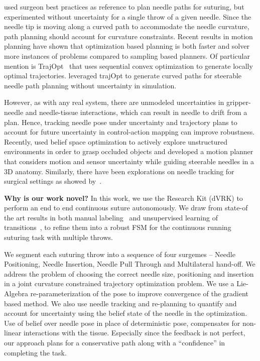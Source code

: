 \documentclass[0-suturing.tex]{subfiles}
\begin{document}
\citet{Jackson2013Needle} used surgeon best practices as reference to plan needle paths for suturing, but experimented without uncertainty for a single throw of a given needle. Since the needle tip is moving along a curved path to accommodate the needle curvature, path planning should account for curvature constraints. Recent results in motion planning have shown that optimization based planning is both faster and solver more instances of problems compared to sampling based planners.
Of particular mention is TrajOpt~\cite{Schulman2014Motion} that uses sequential convex optimization to generate locally optimal trajectories.
\citet{Duan2014Planning} leveraged trajOpt to generate curved paths for steerable needle path planning without uncertainty in simulation.

However, as with any real system, there are unmodeled uncertainties in gripper-needle and needle-tissue interactions, which can result in needle to drift from a plan. Hence, tracking needle pose under uncertainty and trajectory plans to account for future uncertainty in control-action mapping can improve robustness. 
Recently, \cite{Kahn2015Active} used belief space optimization to actively explore unstructured environments in order to grasp occluded objects and \cite{Sun2014Motion} developed a motion planner that considers motion and sensor uncertainty while guiding steerable needles in a 3D anatomy.
Similarly, there have been explorations on needle tracking for surgical settings as showed by~\cite{wengert2007endoscopic, speidel2015image}.

\vspace{3pt}
\noindent \textbf{Why is our work novel? }
In this work, we use the \davinci Research Kit (dVRK) to perform an end to end continuous suture autonomously. We draw from state-of the art results in both manual labeling~\cite{gao2014jhu} and unsupervised learning of transitions~\cite{krishnan2015tsc}, to refine them into a robust FSM for the continuous running suturing task with multiple throws.

We segment each suturing throw into a sequence of four surgemes -- Needle Positioning, Needle Insertion, Needle Pull Through and Multilateral hand-off. We address the problem of choosing the correct needle size, positioning and insertion in a joint curvature constrained trajectory optimization problem. 
We use a Lie-Algebra re-parameterization of the pose to improve convergence of the gradient based method.
We also use needle tracking and re-planning to quantify and account for uncertainty using the belief state of the needle in the optimization. 
Use of belief over needle pose in place of deterministic pose, compensates for non-linear interactions with the tissue. Especially since the feedback is not perfect, our approach plans for a conservative path along with a “confidence” in completing the task.
\end{document}
